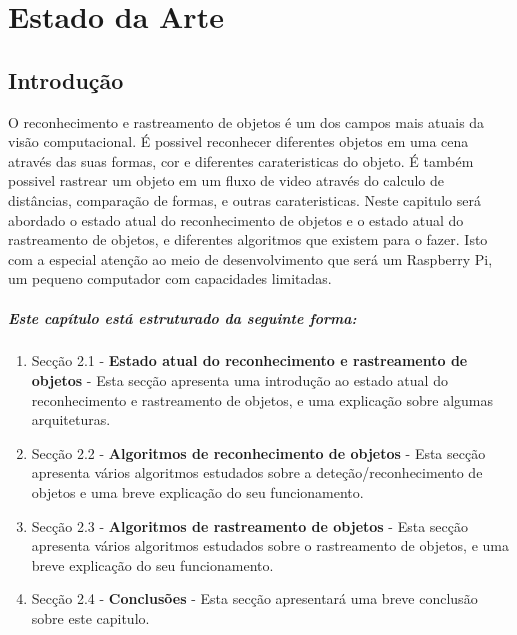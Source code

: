 \chapter{Estado da Arte}
\label{chap:estado-da-arte}

\section{Introdução}
\label{chap2:sec:intro}

O reconhecimento e rastreamento de objetos é um dos campos mais atuais da visão computacional.
\newline É possivel reconhecer diferentes objetos em uma cena através das suas formas, cor e diferentes carateristicas do objeto.
É também possivel rastrear um objeto em um fluxo de video através do calculo de distâncias, comparação de formas, e outras carateristicas.
\newline Neste capitulo será abordado o estado atual do reconhecimento de objetos e o estado atual do rastreamento de objetos, e diferentes algoritmos que existem para o fazer. Isto com a especial atenção ao meio de desenvolvimento que será um Raspberry Pi, um pequeno computador com capacidades limitadas.
\paragraph{Este capítulo está estruturado da seguinte forma:}
\begin{enumerate}
  \item Secção 2.1 - \textbf{Estado atual do reconhecimento e rastreamento de objetos} - Esta secção apresenta uma introdução ao estado atual do reconhecimento e rastreamento de objetos, e uma explicação sobre algumas arquiteturas.
  \item Secção 2.2 - \textbf{Algoritmos de reconhecimento de objetos} - Esta secção apresenta vários algoritmos estudados sobre a deteção/reconhecimento de objetos e uma breve explicação do seu funcionamento. 
  \item Secção 2.3 - \textbf{Algoritmos de rastreamento de objetos} - Esta secção apresenta vários algoritmos estudados sobre o rastreamento de objetos, e uma breve explicação do seu funcionamento.
  \item Secção 2.4 - \textbf{Conclusões} - Esta secção apresentará uma breve conclusão sobre este capitulo.
\end{enumerate}


